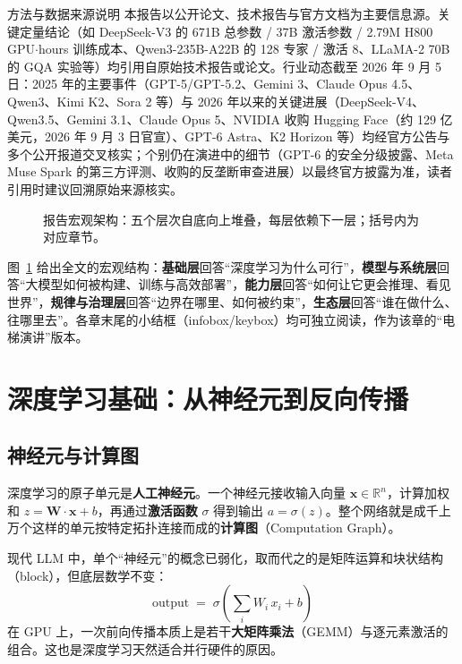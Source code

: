 \documentclass[12pt,a4paper]{article}
\begin{document}
\begin{infobox}{方法与数据来源说明}
本报告以公开论文、技术报告与官方文档为主要信息源。关键定量结论（如 DeepSeek-V3 的 671B 总参数 / 37B 激活参数 / 2.79M H800 GPU$\cdot$hours 训练成本、Qwen3-235B-A22B 的 128 专家 / 激活 8、LLaMA-2 70B 的 GQA 实验等）均引用自原始技术报告或论文。行业动态截至 2026 年 9 月 5 日：2025 年的主要事件（GPT-5/GPT-5.2、Gemini 3、Claude Opus 4.5、Qwen3、Kimi K2、Sora 2 等）与 2026 年以来的关键进展（DeepSeek-V4、Qwen3.5、Gemini 3.1、Claude Opus 5、NVIDIA 收购 Hugging Face（约 129 亿美元，2026 年 9 月 3 日官宣）、GPT-6 Astra、K2 Horizon 等）均经官方公告与多个公开报道交叉核实；个别仍在演进中的细节（GPT-6 的安全分级披露、Meta Muse Spark 的第三方评测、收购的反垄断审查进展）以最终官方披露为准，读者引用时建议回溯原始来源核实。
\end{infobox}

\begin{figure}[htbp]
\centering

\caption{报告宏观架构：五个层次自底向上堆叠，每层依赖下一层；括号内为对应章节。}
\label{fig:macro}
\end{figure}

图~\ref{fig:macro} 给出全文的宏观结构：\textbf{基础层}回答“深度学习为什么可行”，\textbf{模型与系统层}回答“大模型如何被构建、训练与高效部署”，\textbf{能力层}回答“如何让它更会推理、看见世界”，\textbf{规律与治理层}回答“边界在哪里、如何被约束”，\textbf{生态层}回答“谁在做什么、往哪里去”。各章末尾的小结框（infobox/keybox）均可独立阅读，作为该章的“电梯演讲”版本。

\newpage
\section{深度学习基础：从神经元到反向传播}
\subsection{神经元与计算图}
深度学习的原子单元是\textbf{人工神经元}。一个神经元接收输入向量 $\mathbf{x}\in\mathbb{R}^n$，计算加权和 $z=\mathbf{W}\cdot\mathbf{x}+b$，再通过\textbf{激活函数} $\sigma$ 得到输出 $a=\sigma(z)$。整个网络就是成千上万个这样的单元按特定拓扑连接而成的\textbf{计算图}（Computation Graph）。

现代 LLM 中，单个“神经元”的概念已弱化，取而代之的是矩阵运算和块状结构（block），但底层数学不变：
\[
\text{output} \;=\; \sigma\!\left(\sum_{i} W_i\, x_i + b\right)
\]
在 GPU 上，一次前向传播本质上是若干\textbf{大矩阵乘法}（GEMM）与逐元素激活的组合。这也是深度学习天然适合并行硬件的原因。
\end{document}
